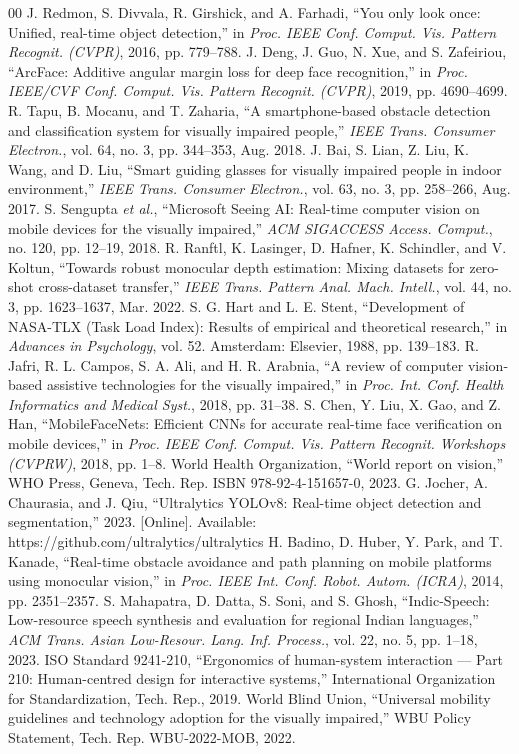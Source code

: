 \documentclass[conference]{IEEEtran}
\begin{document}
\begin{thebibliography}{00}
 J. Redmon, S. Divvala, R. Girshick, and A. Farhadi, ``You only look once: Unified, real-time object detection,'' in \textit{Proc. IEEE Conf. Comput. Vis. Pattern Recognit. (CVPR)}, 2016, pp. 779--788.
 J. Deng, J. Guo, N. Xue, and S. Zafeiriou, ``ArcFace: Additive angular margin loss for deep face recognition,'' in \textit{Proc. IEEE/CVF Conf. Comput. Vis. Pattern Recognit. (CVPR)}, 2019, pp. 4690--4699.
 R. Tapu, B. Mocanu, and T. Zaharia, ``A smartphone-based obstacle detection and classification system for visually impaired people,'' \textit{IEEE Trans. Consumer Electron.}, vol. 64, no. 3, pp. 344--353, Aug. 2018.
 J. Bai, S. Lian, Z. Liu, K. Wang, and D. Liu, ``Smart guiding glasses for visually impaired people in indoor environment,'' \textit{IEEE Trans. Consumer Electron.}, vol. 63, no. 3, pp. 258--266, Aug. 2017.
 S. Sengupta \textit{et al.}, ``Microsoft Seeing AI: Real-time computer vision on mobile devices for the visually impaired,'' \textit{ACM SIGACCESS Access. Comput.}, no. 120, pp. 12--19, 2018.
 R. Ranftl, K. Lasinger, D. Hafner, K. Schindler, and V. Koltun, ``Towards robust monocular depth estimation: Mixing datasets for zero-shot cross-dataset transfer,'' \textit{IEEE Trans. Pattern Anal. Mach. Intell.}, vol. 44, no. 3, pp. 1623--1637, Mar. 2022.
 S. G. Hart and L. E. Stent, ``Development of NASA-TLX (Task Load Index): Results of empirical and theoretical research,'' in \textit{Advances in Psychology}, vol. 52. Amsterdam: Elsevier, 1988, pp. 139--183.
 R. Jafri, R. L. Campos, S. A. Ali, and H. R. Arabnia, ``A review of computer vision-based assistive technologies for the visually impaired,'' in \textit{Proc. Int. Conf. Health Informatics and Medical Syst.}, 2018, pp. 31--38.
 S. Chen, Y. Liu, X. Gao, and Z. Han, ``MobileFaceNets: Efficient CNNs for accurate real-time face verification on mobile devices,'' in \textit{Proc. IEEE Conf. Comput. Vis. Pattern Recognit. Workshops (CVPRW)}, 2018, pp. 1--8.
 World Health Organization, ``World report on vision,'' WHO Press, Geneva, Tech. Rep. ISBN 978-92-4-151657-0, 2023.
 G. Jocher, A. Chaurasia, and J. Qiu, ``Ultralytics YOLOv8: Real-time object detection and segmentation,'' 2023. [Online]. Available: https://github.com/ultralytics/ultralytics
 H. Badino, D. Huber, Y. Park, and T. Kanade, ``Real-time obstacle avoidance and path planning on mobile platforms using monocular vision,'' in \textit{Proc. IEEE Int. Conf. Robot. Autom. (ICRA)}, 2014, pp. 2351--2357.
 S. Mahapatra, D. Datta, S. Soni, and S. Ghosh, ``Indic-Speech: Low-resource speech synthesis and evaluation for regional Indian languages,'' \textit{ACM Trans. Asian Low-Resour. Lang. Inf. Process.}, vol. 22, no. 5, pp. 1--18, 2023.
 ISO Standard 9241-210, ``Ergonomics of human-system interaction --- Part 210: Human-centred design for interactive systems,'' International Organization for Standardization, Tech. Rep., 2019.
 World Blind Union, ``Universal mobility guidelines and technology adoption for the visually impaired,'' WBU Policy Statement, Tech. Rep. WBU-2022-MOB, 2022.
\end{thebibliography}
\end{document}
